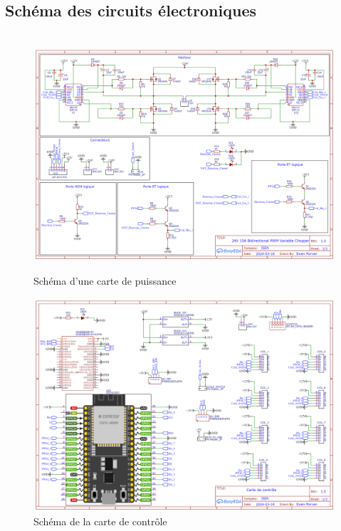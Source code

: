 \documentclass{article}
\begin{document}
\subsection{Schéma des circuits électroniques}
    \begin{figure}[H]
    \centering

    \
        \includegraphics[width = 1.2\textwidth,angle = 90]{Images/Schematic_ProjetM1Isen.png}
        \caption{Schéma d'une carte de puissance}
        \label{fig:schema_carte_puissance}
    \end{figure}
    \newpage
    \begin{figure}[H]
    \centering

        \includegraphics[width = 1.2\textwidth,angle = 90]{Images/Schematic_ProjetM1Isen_controlCard.png}
        \caption{Schéma de la carte de contrôle}
        \label{fig:schema_carte_contrôle}
    \end{figure}
\end{document}
